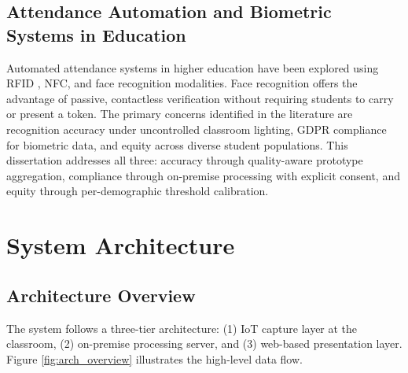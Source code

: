 \documentclass[12pt,a4paper]{report}
\begin{document}
\section{Attendance Automation and Biometric Systems in Education}
Automated attendance systems in higher education have been explored using RFID \cite{rahman2020iot}, NFC, and face recognition modalities. Face recognition offers the advantage of passive, contactless verification without requiring students to carry or present a token. The primary concerns identified in the literature are recognition accuracy under uncontrolled classroom lighting, GDPR compliance for biometric data, and equity across diverse student populations. This dissertation addresses all three: accuracy through quality-aware prototype aggregation, compliance through on-premise processing with explicit consent, and equity through per-demographic threshold calibration.

\chapter{System Architecture}

\section{Architecture Overview}

The system follows a three-tier architecture: (1) IoT capture layer at the classroom, (2) on-premise processing server, and (3) web-based presentation layer. Figure \ref{fig:arch_overview} illustrates the high-level data flow.
\end{document}
